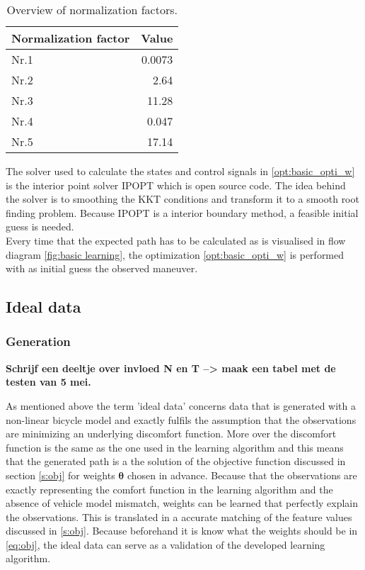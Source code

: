 \begin{table}[h!]\label{table:norm}
  \centering
  \begin{tabular}{@{}lr@{}} 
    Normalization factor    & Value\\ \midrule
    Nr.1      & 0.0073\\
    Nr.2          & 2.64\\
    Nr.3       & 11.28\\
    Nr.4       & 0.047\\
    Nr.5  & 17.14\\ \bottomrule
  \end{tabular}
  \caption{Overview of  normalization factors.}
\end{table}

The solver used to calculate the states and control signals in \ref{opt:basic_opti_w} is the interior point solver IPOPT which is open source code. The idea behind the solver is to smoothing the KKT conditions and transform it to a smooth root finding problem. \cite{Panos_opti} Because IPOPT is a interior boundary method, a feasible initial guess is needed.\\
Every time that the expected path has to be calculated as is visualised in flow diagram \ref{fig:basic learning}, the optimization \ref{opt:basic_opti_w} is performed with as initial guess the observed maneuver.\\

\subsection{Ideal data} \label{s:GD}
\subsubsection{Generation}
\textbf{Schrijf een deeltje over invloed N en T --> maak een tabel met de testen van 5 mei.}

As mentioned above the term 'ideal data' concerns data that is generated with a non-linear bicycle model and exactly fulfils the assumption that the observations are minimizing an underlying discomfort function. More over the discomfort function is the same as the one used in the learning algorithm and this means that the generated path is a the solution of the objective function discussed in section \ref{s:obj} for weights $\bm{\theta}$ chosen in advance. Because that the observations are exactly representing the comfort function in the learning algorithm and the absence of vehicle model mismatch, weights can be learned that perfectly explain the observations. This is translated in a accurate matching of the feature values discussed in \ref{s:obj}. Because beforehand it is know what the weights should be in \ref{eq:obj}, the ideal data can serve as a validation of the developed learning algorithm.\\

